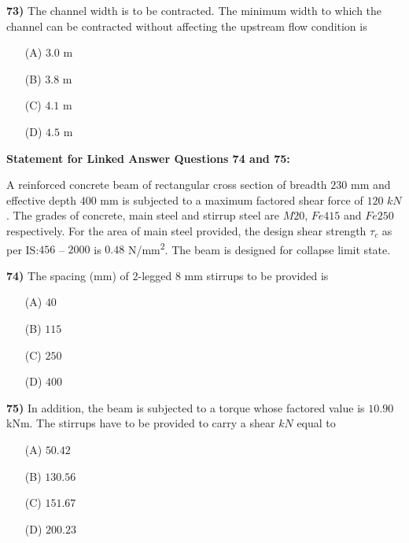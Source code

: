 \documentclass[journal]{IEEEtran}
\begin{document}
\begin{enumerate}
\textbf{73)} \quad The channel width is to be contracted. The minimum width to which the channel can be contracted without affecting the upstream flow condition is \textbf{}

\begin{itemize}
    \item[(A)] $3.0$ m
    \item[(B)] $3.8$ m
    \item[(C)] $4.1$ m
    \item[(D)] $4.5$ m
\end{itemize}

\vspace{1cm}

\textbf{Statement for Linked Answer Questions 74 and 75:}

A reinforced concrete beam of rectangular cross section of breadth $230$ mm and effective depth $400$ mm is subjected to a maximum factored shear force of $120$ $kN$. The grades of concrete, main steel and stirrup steel are $M20$, $Fe415$ and $Fe250$ respectively. For the area of main steel provided, the design shear strength $\tau_c$ as per IS:$456$ --  $2000$ is $0.48$ N/mm\textsuperscript{2}. The beam is designed for collapse limit state.

\vspace{0.5cm}

\textbf{74)} \hspace{0.2cm} The spacing (mm) of 2-legged 8 mm stirrups to be provided is \textbf{}
\begin{itemize}
  \item[(A)] $40$
  \item[(B)] $115$
  \item[(C)] $250$
  \item[(D)] $400$
\end{itemize}

\vspace{0.5cm}

\textbf{75)} \hspace{0.2cm} In addition, the beam is subjected to a torque whose factored value is $10.90$ kNm. The stirrups have to be provided to carry a shear $kN$ equal to \textbf{}
\begin{itemize}
  \item[(A)] $50.42$
  \item[(B)] $130.56$
  \item[(C)] $151.67$
  \item[(D)] $200.23$
\end{itemize}


\end{enumerate}
\end{document}
